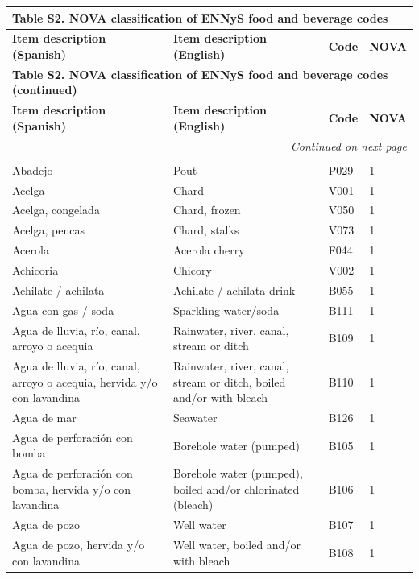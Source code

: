 \setlength{\LTleft}{\fill}
\setlength{\LTright}{\fill}
{\footnotesize
\setlength{\tabcolsep}{4pt}
\begin{longtable}{p{4.3cm}p{5.5cm}p{1.5cm}p{0.7cm}}
\multicolumn{4}{l}{\textbf{Table S2. NOVA classification of ENNyS food and beverage codes}}\\
\toprule
\textbf{Item description (Spanish)} & \textbf{Item description (English)} & \textbf{Code} & \textbf{NOVA}\\
\midrule
\endfirsthead
\multicolumn{4}{l}{\textbf{Table S2. NOVA classification of ENNyS food and beverage codes (continued)}}\\
\toprule
\textbf{Item description (Spanish)} & \textbf{Item description (English)} & \textbf{Code} & \textbf{NOVA}\\
\midrule
\endhead
\midrule
\multicolumn{4}{r}{\emph{Continued on next page}}\\
\endfoot
\bottomrule
\endlastfoot
\multicolumn{4}{l}{\textbf{NOVA 1. Unprocessed or minimally processed foods}}\\
Abadejo & Pout & P029 & 1\\
Acelga & Chard & V001 & 1\\
Acelga, congelada & Chard, frozen & V050 & 1\\
Acelga, pencas & Chard, stalks & V073 & 1\\
Acerola & Acerola cherry & F044 & 1\\
Achicoria & Chicory & V002 & 1\\
Achilate / achilata & Achilate / achilata drink & B055 & 1\\
Agua con gas / soda & Sparkling water/soda & B111 & 1\\
Agua de lluvia, río, canal, arroyo o acequia & Rainwater, river, canal, stream or ditch & B109 & 1\\
Agua de lluvia, río, canal, arroyo o acequia, hervida y/o con lavandina & Rainwater, river, canal, stream or ditch, boiled and/or with bleach & B110 & 1\\
Agua de mar & Seawater & B126 & 1\\
Agua de perforación con bomba & Borehole water (pumped) & B105 & 1\\
Agua de perforación con bomba, hervida y/o con lavandina & Borehole water (pumped), boiled and/or chlorinated (bleach) & B106 & 1\\
Agua de pozo & Well water & B107 & 1\\
Agua de pozo, hervida y/o con lavandina & Well water, boiled and/or with bleach & B108 & 1\\

\end{longtable}}
